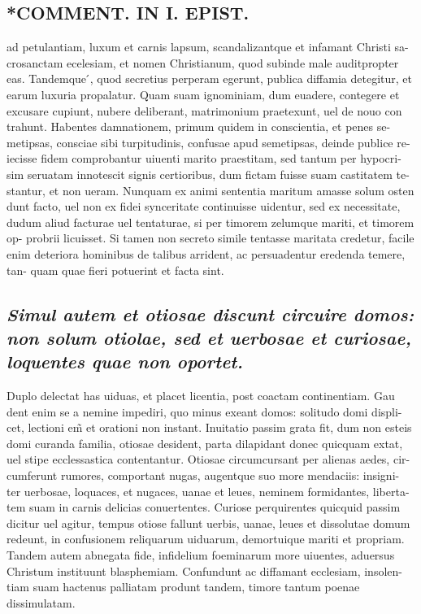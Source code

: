 \documentclass{article}
\begin{document}
\begin{pages}
\section*{*COMMENT. IN I. EPIST. }
\marginpar{[ p.520 ]}\pstart ad petulantiam, luxum et carnis lapsum, scandalizantque et infamant Christi sa- crosanctam ecelesiam, et nomen Christianum, quod subinde male auditpropter eas. Tandemque ́, quod secretius perperam egerunt, publica diffamia detegitur, et earum luxuria propalatur. Quam suam ignominiam, dum euadere, contegere et excusare cupiunt, nubere deliberant, matrimonium praetexunt, uel de nouo con trahunt. Habentes damnationem, primum quidem in conscientia, et penes se- metipsas, consciae sibi turpitudinis, confusae apud semetipsas, deinde publice re- iecisse fidem comprobantur uiuenti marito praestitam, sed tantum per hypocri- sim seruatam innotescit signis certioribus, dum fictam fuisse suam castitatem te- stantur, et non ueram. Nunquam ex animi sententia maritum amasse solum osten dunt facto, uel non ex fidei synceritate continuisse uidentur, sed ex necessitate, dudum aliud facturae uel tentaturae, si per timorem zelumque mariti, et timorem op- probrii licuisset. Si tamen non secreto simile tentasse maritata credetur, facile enim deteriora hominibus de talibus arrident, ac persuadentur eredenda temere, tan- quam quae fieri potuerint et facta sint.  \pend
{}
{}
\subsection*{\textit{Simul autem et otiosae discunt circuire domos: non solum otiolae, sed et uerbosae et curiosae, loquentes quae non oportet. }}\pstart Duplo delectat has uiduas, et placet licentia, post coactam continentiam. Gau dent enim se a nemine impediri, quo minus exeant domos: solitudo domi displi- cet, lectioni em̃ et orationi non instant. Inuitatio passim grata fit, dum non esteis domi curanda familia, otiosae desident, parta dilapidant donec quicquam extat, uel stipe ecclessastica contentantur. Otiosae circumcursant per alienas aedes, cir- cumferunt rumores, comportant nugas, augentque suo more mendaciis: insigni- ter uerbosae, loquaces, et nugaces, uanae et leues, neminem formidantes, liberta- tem suam in carnis delicias conuertentes. Curiose perquirentes quicquid passim dicitur uel agitur, tempus otiose fallunt uerbis, uanae, leues et dissolutae domum redeunt, in confusionem reliquarum uiduarum, demortuique mariti et propriam. Tandem autem abnegata fide, infidelium foeminarum more uiuentes, aduersus Christum instituunt blasphemiam. Confundunt ac diffamant ecclesiam, insolen- tiam suam hactenus palliatam produnt tandem, timore tantum poenae dissimulatam.  \pend
{}
{}

\end{pages}
\end{document}
